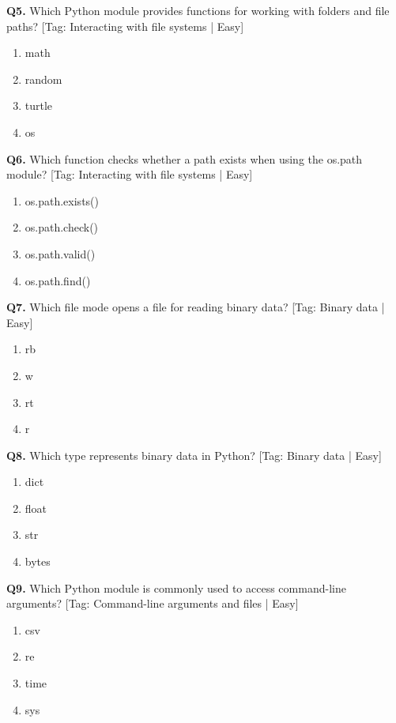 \vspace{2mm}
\noindent\textbf{Q5.} Which Python module provides functions for working with folders and file paths? \hfill [Tag: Interacting with file systems | Easy]
\begin{enumerate}[label=(\alph*),topsep=2pt,itemsep=1pt,partopsep=0pt,parsep=0pt]
    \item {math}
    \item {random}
    \item {turtle}
    \item {os}
\end{enumerate}
\vspace{2mm}
\noindent\textbf{Q6.} Which function checks whether a path exists when using the os.path module? \hfill [Tag: Interacting with file systems | Easy]
\begin{enumerate}[label=(\alph*),topsep=2pt,itemsep=1pt,partopsep=0pt,parsep=0pt]
    \item {os.path.exists()}
    \item {os.path.check()}
    \item {os.path.valid()}
    \item {os.path.find()}
\end{enumerate}
\vspace{2mm}
\noindent\textbf{Q7.} Which file mode opens a file for reading binary data? \hfill [Tag: Binary data | Easy]
\begin{enumerate}[label=(\alph*),topsep=2pt,itemsep=1pt,partopsep=0pt,parsep=0pt]
    \item {rb}
    \item {w}
    \item {rt}
    \item {r}
\end{enumerate}
\vspace{2mm}
\noindent\textbf{Q8.} Which type represents binary data in Python? \hfill [Tag: Binary data | Easy]
\begin{enumerate}[label=(\alph*),topsep=2pt,itemsep=1pt,partopsep=0pt,parsep=0pt]
    \item {dict}
    \item {float}
    \item {str}
    \item {bytes}
\end{enumerate}
\vspace{2mm}
\noindent\textbf{Q9.} Which Python module is commonly used to access command-line arguments? \hfill [Tag: Command-line arguments and files | Easy]
\begin{enumerate}[label=(\alph*),topsep=2pt,itemsep=1pt,partopsep=0pt,parsep=0pt]
    \item {csv}
    \item {re}
    \item {time}
    \item {sys}
\end{enumerate}
